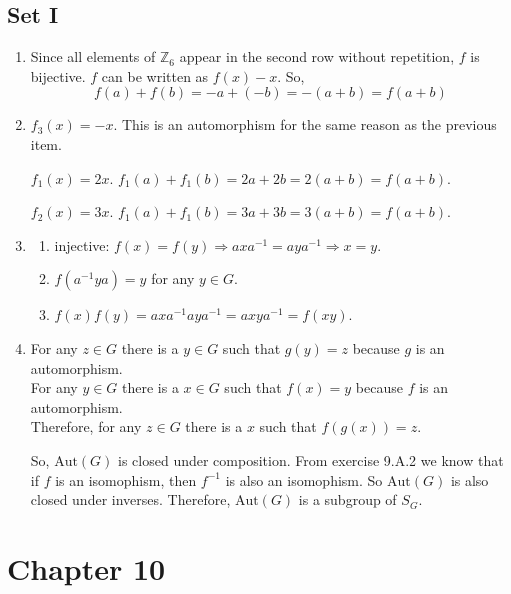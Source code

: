 \documentclass{article}
\begin{document}
\subsection{Set I}
\begin{enumerate}
    \item Since all elements of $ \mathbb{Z}_6 $ appear in the second row without repetition, $ f $ is bijective. $ f $ can be written as $ f(x) -x $. So,
    $$
        f(a) + f(b) = -a + (-b) = -(a + b) = f(a + b)
    $$

    \item $ f_3(x) = -x $. This is an automorphism for the same reason as the previous item.

    $ f_1(x) = 2x $. $ f_1(a) + f_1(b) = 2a + 2b = 2(a + b) = f(a + b) $.

    $ f_2(x) = 3x $. $ f_1(a) + f_1(b) = 3a + 3b = 3(a + b) = f(a + b) $.

    \item
        \begin{enumerate}
            \item injective: $ f(x) = f(y) \Rightarrow axa^{-1} = aya^{-1} \Rightarrow x = y $.

            \item $ f(a^{-1}ya) = y$ for any $ y \in G $.

            \item $ f(x)f(y) = axa^{-1}aya^{-1} = axya^{-1} = f(xy) $.
        \end{enumerate}

    \item
        For any $ z \in G $ there is a $ y \in G $ such that $ g(y) = z $ because $ g $ is an automorphism.\\
        For any $ y \in G $ there is a $ x \in G $ such that $ f(x) = y $ because $ f$ is an automorphism.\\
        Therefore, for any $ z \in G $ there is a $ x $ such that $ f(g(x)) = z $.

        So, $ \text{Aut}(G) $ is closed under composition. From exercise 9.A.2 we know that if $ f $ is an isomophism, then $ f^{-1} $ is also an isomophism. So $\text{Aut}(G)$ is also closed under inverses. Therefore, $\text{Aut}(G)$ is a subgroup of $ S_G $.
\end{enumerate}

\section{Chapter 10}
\end{document}
